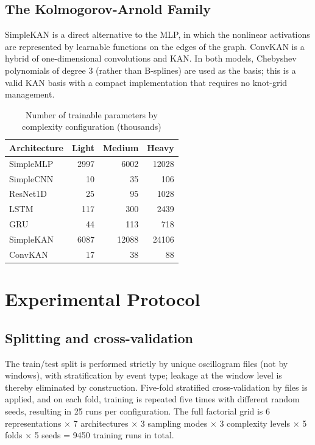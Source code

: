 \documentclass{ieeeojies}
\begin{document}
\subsection{The Kolmogorov-Arnold Family}

SimpleKAN is a direct alternative to the MLP, in which the nonlinear activations are represented by learnable functions on the edges of the graph. ConvKAN is a hybrid of one-dimensional convolutions and KAN. In both models, Chebyshev polynomials of degree 3 (rather than B-splines) are used as the basis; this is a valid KAN basis with a compact implementation that requires no knot-grid management.


\begin{table}[!t]
\caption{Number of trainable parameters by complexity configuration (thousands)}\label{tab1}
\centering
\begin{tabular}{lrrr}
\hline
Architecture & Light & Medium & Heavy\\ \hline
SimpleMLP & 2997 & 6002 & 12028\\
SimpleCNN & 10 & 35 & 106\\
ResNet1D & 25 & 95 & 1028\\
LSTM & 117 & 300 & 2439\\
GRU & 44 & 113 & 718\\
SimpleKAN & 6087 & 12088 & 24106\\
ConvKAN & 17 & 38 & 88\\ \hline
\end{tabular}
\par\vspace{2pt}{\footnotesize Number of trainable parameters (thousands) for the symmetric-polar input / full window (162 channels $\times$ 289 samples). The values depend on the input dimensionality: under compression to two snapshots, the parameters of the fully connected models (SimpleMLP, SimpleKAN) shrink by an order of magnitude.}
\end{table}

\section{Experimental Protocol}

\subsection{Splitting and cross-validation}

The train/test split is performed strictly by unique oscillogram files (not by windows), with stratification by event type; leakage at the window level is thereby eliminated by construction. Five-fold stratified cross-validation by files is applied, and on each fold, training is repeated five times with different random seeds, resulting in 25 runs per configuration. The full factorial grid is 6 representations × 7 architectures × 3 sampling modes × 3 complexity levels × 5 folds × 5 seeds = 9450 training runs in total.
\end{document}
